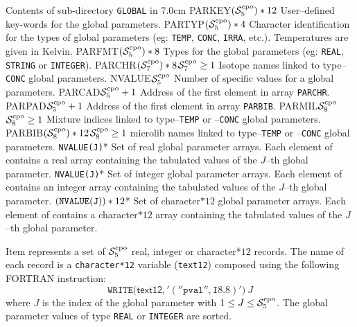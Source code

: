 \begin{DescriptionEnregistrement}{Contents of sub-directory {\tt GLOBAL} in
}{7.0cm}
\label{tabl:tabglob}
\CharEnr
  {PARKEY}{$(\mathcal{S}^{\rm cpo}_{5})*12$}
  {User--defined key-words for the global parameters.}
\CharEnr
  {PARTYP}{$(\mathcal{S}^{\rm cpo}_{5})*4$}
  {Character identification for the types of global parameters (eg: {\tt TEMP}, {\tt CONC}, {\tt IRRA},
  etc.). Temperatures are given in Kelvin.}
\CharEnr
  {PARFMT}{$(\mathcal{S}^{\rm cpo}_{5})*8$}
  {Types for the global parameters (eg: {\tt REAL}, {\tt STRING} or {\tt INTEGER}).}
\OptCharEnr
  {PARCHR}{$(\mathcal{S}^{\rm cpo}_{7})*8$}{$\mathcal{S}^{\rm cpo}_{7}\ge 1$}
  {Isotope names linked to type--{\tt CONC} global parameters.}
\IntEnr
  {NVALUE}{$\mathcal{S}^{\rm cpo}_{5}$}
  {Number of specific values for a global parameters.}
\IntEnr
  {PARCAD}{$\mathcal{S}^{\rm cpo}_{5}+1$}
  {Address of the first element in array {\tt PARCHR}.}
\IntEnr
  {PARPAD}{$\mathcal{S}^{\rm cpo}_{5}+1$}
  {Address of the first element in array {\tt PARBIB}.}
\OptIntEnr
  {PARMIL}{$\mathcal{S}^{\rm cpo}_{8}$}{$\mathcal{S}^{\rm cpo}_{8}\ge 1$}
  {Mixture indices linked to type--{\tt TEMP} or --{\tt CONC} global parameters.}
\OptCharEnr
  {PARBIB}{$(\mathcal{S}^{\rm cpo}_{8})*12$}{$\mathcal{S}^{\rm cpo}_{8}\ge 1$}
  {{\sc microlib} names linked to type--{\tt TEMP} or --{\tt CONC} global parameters.}
\OptRealVar
  {}{\tt NVALUE(J)}{*}{}
  {Set of real global parameter arrays. Each element of  contains a
   real array containing the tabulated values of the $J$--th global parameter.}
\OptIntVar
  {}{\tt NVALUE(J)}{*}
  {Set of integer global parameter arrays.  Each element of  contains an
   integer array containing the tabulated values of the $J$--th global parameter.}
\OptCharVar
  {}{$({\tt NVALUE(J)})*12$}{*}
  {Set of character$*12$ global parameter arrays. Each element of  contains a
   character$*12$ array containing the tabulated values of the $J$--th global parameter.}
\end{DescriptionEnregistrement}

Item  represents a set of $\mathcal{S}^{\rm cpo}_{5}$ real,
integer or character*$12$ records. The name of each
 record is a {\tt character*12} variable ({\tt text12})
composed using the following FORTRAN instruction:
$$
\mathtt{WRITE(}\mathsf{text12}\mathtt{,'(''pval'',I8.8)')}\: J
$$
where $J$ is the index of the global parameter with $1 \leq J \leq \mathcal{S}^{\rm cpo}_{5}$. The global
parameter values of type {\tt REAL} or {\tt INTEGER} are sorted.

